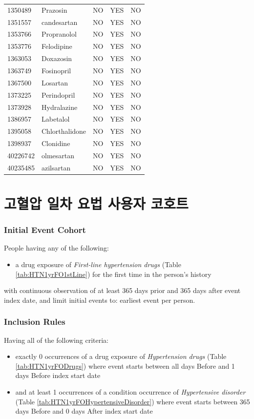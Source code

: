 \documentclass[10.5pt]{book}
\providecommand{\tightlist}{%
  \setlength{\itemsep}{0pt}\setlength{\parskip}{0pt}}
\theoremstyle{definition}
\theoremstyle{definition}
\theoremstyle{definition}
\theoremstyle{remark}
\begin{document}
\begin{longtable}[]{@{}lllll@{}}
1350489 & Prazosin & NO & YES & NO\tabularnewline
1351557 & candesartan & NO & YES & NO\tabularnewline
1353766 & Propranolol & NO & YES & NO\tabularnewline
1353776 & Felodipine & NO & YES & NO\tabularnewline
1363053 & Doxazosin & NO & YES & NO\tabularnewline
1363749 & Fosinopril & NO & YES & NO\tabularnewline
1367500 & Losartan & NO & YES & NO\tabularnewline
1373225 & Perindopril & NO & YES & NO\tabularnewline
1373928 & Hydralazine & NO & YES & NO\tabularnewline
1386957 & Labetalol & NO & YES & NO\tabularnewline
1395058 & Chlorthalidone & NO & YES & NO\tabularnewline
1398937 & Clonidine & NO & YES & NO\tabularnewline
40226742 & olmesartan & NO & YES & NO\tabularnewline
40235485 & azilsartan & NO & YES & NO\tabularnewline
\bottomrule
\end{longtable}

\section{고혈압 일차 요법 사용자 코호트}\label{HTN1yrFO}

\subsubsection*{Initial Event Cohort}\label{initial-event-cohort-5}

People having any of the following:

\begin{itemize}
\tightlist
\item
  a drug exposure of \emph{First-line hypertension drugs} (Table
  \ref{tab:HTN1yrFO1stLine}) for the first time in the person's history
\end{itemize}

with continuous observation of at least 365 days prior and 365 days
after event index date, and limit initial events to: earliest event per
person.

\subsubsection*{Inclusion Rules}\label{inclusion-rules-2}

Having all of the following criteria:

\begin{itemize}
\tightlist
\item
  exactly 0 occurrences of a drug exposure of \emph{Hypertension drugs}
  (Table \ref{tab:HTN1yrFODrugs}) where event starts between all days
  Before and 1 days Before index start date
\item
  and at least 1 occurrences of a condition occurrence of
  \emph{Hypertensive disorder} (Table
  \ref{tab:HTN1yrFOHypertensiveDisorder}) where event starts between 365
  days Before and 0 days After index start date
\end{itemize}
\end{document}
